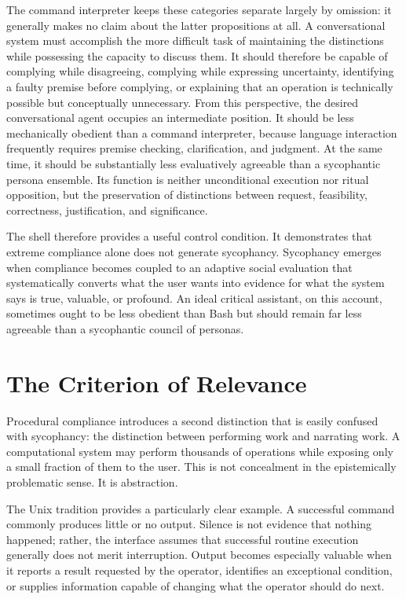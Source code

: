 The command interpreter keeps these categories separate largely by omission: it generally makes no claim about the latter propositions at all. A conversational system must accomplish the more difficult task of maintaining the distinctions while possessing the capacity to discuss them. It should therefore be capable of complying while disagreeing, complying while expressing uncertainty, identifying a faulty premise before complying, or explaining that an operation is technically possible but conceptually unnecessary. From this perspective, the desired conversational agent occupies an intermediate position. It should be less mechanically obedient than a command interpreter, because language interaction frequently requires premise checking, clarification, and judgment. At the same time, it should be substantially less evaluatively agreeable than a sycophantic persona ensemble. Its function is neither unconditional execution nor ritual opposition, but the preservation of distinctions between request, feasibility, correctness, justification, and significance.

The shell therefore provides a useful control condition. It demonstrates that extreme compliance alone does not generate sycophancy. Sycophancy emerges when compliance becomes coupled to an adaptive social evaluation that systematically converts what the user wants into evidence for what the system says is true, valuable, or profound. An ideal critical assistant, on this account, sometimes ought to be less obedient than Bash but should remain far less agreeable than a sycophantic council of personas.

\section{The Criterion of Relevance}

Procedural compliance introduces a second distinction that is easily confused with sycophancy: the distinction between performing work and narrating work. A computational system may perform thousands of operations while exposing only a small fraction of them to the user. This is not concealment in the epistemically problematic sense. It is abstraction.

The Unix tradition provides a particularly clear example. A successful command commonly produces little or no output. Silence is not evidence that nothing happened; rather, the interface assumes that successful routine execution generally does not merit interruption. Output becomes especially valuable when it reports a result requested by the operator, identifies an exceptional condition, or supplies information capable of changing what the operator should do next.

